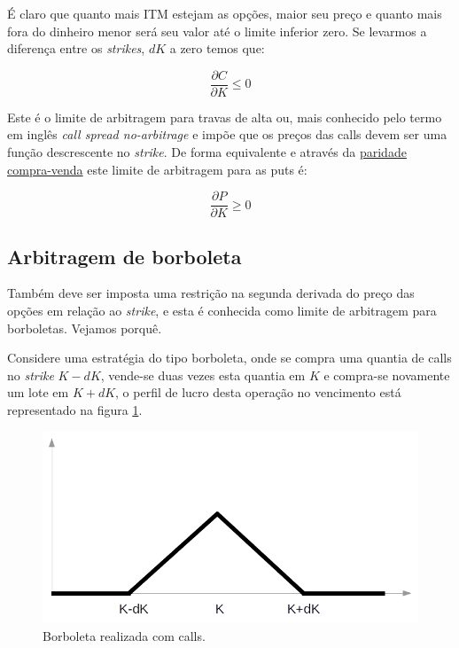 \documentclass[]{book}
\begin{document}
É claro que quanto mais ITM estejam as opções, maior seu preço e quanto
mais fora do dinheiro menor será seu valor até o limite inferior zero.
Se levarmos a diferença entre os \emph{strikes}, \(dK\) a zero temos
que:

\begin{equation}
\frac{\partial C}{\partial K}\leq 0
\end{equation}

Este é o limite de arbitragem para travas de alta ou, mais conhecido
pelo termo em inglês \emph{call spread no-arbitrage} e impõe que os
preços das calls devem ser uma função descrescente no \emph{strike}. De
forma equivalente e através da \protect\hyperlink{putcalparity}{paridade
compra-venda} este limite de arbitragem para as puts é:

\begin{equation}
\frac{\partial P}{\partial K}\geq 0
\end{equation}

\subsection{Arbitragem de borboleta}\label{arbitragem-de-borboleta}

Também deve ser imposta uma restrição na segunda derivada do preço das
opções em relação ao \emph{strike}, e esta é conhecida como limite de
arbitragem para borboletas. Vejamos porquê.

Considere uma estratégia do tipo borboleta, onde se compra uma quantia
de calls no \emph{strike} \(K-dK\), vende-se duas vezes esta quantia em
\(K\) e compra-se novamente um lote em \(K+dK\), o perfil de lucro desta
operação no vencimento está representado na figura \ref{fig:borboleta}.

\begin{figure}
\centering
\includegraphics{./images/borboleta.png}
\caption{\label{fig:borboleta}Borboleta realizada com calls.}
\end{figure}
\end{document}
